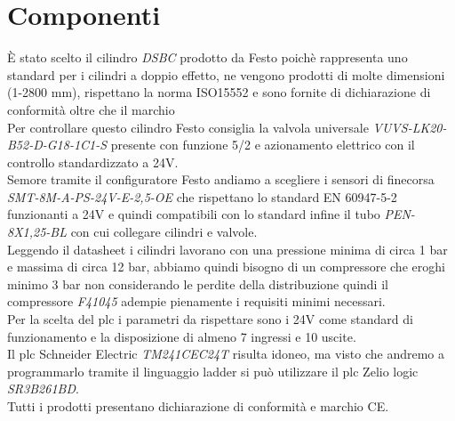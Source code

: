 \documentclass[12pt]{article}
\begin{document}
\section{Componenti}
È stato scelto il cilindro \textit{DSBC} prodotto da Festo poichè rappresenta uno standard per i cilindri a
doppio effetto, ne vengono prodotti di molte dimensioni (1-2800 mm), rispettano la norma ISO15552 e sono fornite di dichiarazione di conformità
oltre che il marchio \\
Per controllare questo cilindro Festo consiglia la valvola universale \textit{VUVS-LK20-B52-D-G18-1C1-S} presente con funzione 5/2 e azionamento elettrico
con il controllo standardizzato a 24V.\\
Semore tramite il configuratore Festo andiamo a scegliere i sensori di finecorsa \textit{SMT-8M-A-PS-24V-E-2,5-OE} che rispettano lo standard
EN 60947-5-2 funzionanti a 24V e quindi compatibili con lo standard infine il tubo \textit{PEN-8X1,25-BL} con cui collegare cilindri e
valvole.\\
Leggendo il datasheet i cilindri lavorano con una pressione minima di circa 1 bar e massima di circa 12 bar, abbiamo quindi bisogno
di un compressore che eroghi minimo 3 bar non considerando le perdite della distribuzione quindi il compressore \textit{F41045} adempie
pienamente i requisiti minimi necessari.\\
Per la scelta del plc i parametri da rispettare sono i 24V come standard di funzionamento e la disposizione di almeno 7 ingressi e
10 uscite.\\
Il plc Schneider Electric \textit{TM241CEC24T} risulta idoneo, ma visto che andremo a programmarlo tramite il
linguaggio ladder si può utilizzare il plc Zelio logic \textit{SR3B261BD}.\\
Tutti i prodotti presentano dichiarazione di conformità e marchio CE.\\
\end{document}
